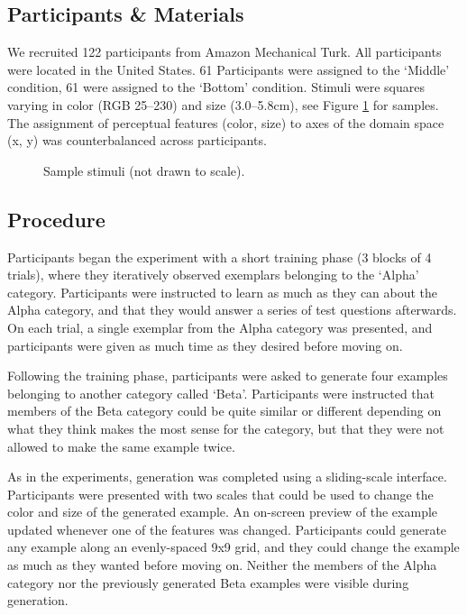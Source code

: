 \documentclass[10pt,letterpaper]{article}
\begin{document}
\subsection{Participants \& Materials}

We recruited 122 participants from Amazon Mechanical Turk. All participants were located in the United States. 61 Participants were assigned to the `Middle' condition, 61 were assigned to the `Bottom' condition. Stimuli were squares varying in color (RGB 25--230) and size (3.0--5.8cm), see Figure \ref{fig:stimuli-samples} for samples. The assignment of perceptual features (color, size) to axes of the domain space (x, y) was counterbalanced across participants.

\begin{figure}
    \begin{center}
    
    \caption{Sample stimuli (not drawn to scale).}
    \label{fig:stimuli-samples}
    \end{center}
\end{figure}

\subsection{Procedure}

Participants began the experiment with a short training phase (3 blocks of 4 trials), where they iteratively observed exemplars belonging to the `Alpha' category. Participants were instructed to learn as much as they can about the Alpha category, and that they would answer a series of test questions afterwards. On each trial, a single exemplar from the Alpha category was presented, and participants were given as much time as they desired before moving on. 

Following the training phase, participants were asked to generate four examples belonging to another category called `Beta'. Participants were instructed that members of the Beta category could be quite similar or different depending on what they think makes the most sense for the category, but that they were not allowed to make the same example twice. 

As in the \citet{jern2013probabilistic} experiments, generation was completed using a sliding-scale interface. Participants were presented with two scales that could be used to change the color and size of the generated example. An on-screen preview of the example updated whenever one of the features was changed. Participants could generate any example along an evenly-spaced 9x9 grid, and they could change the example as much as they wanted before moving on. Neither the members of the Alpha category nor the previously generated Beta examples were visible during generation.
\end{document}

